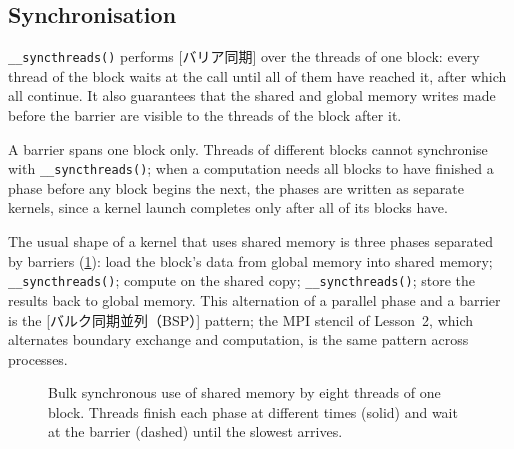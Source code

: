 \documentclass[../main.tex]{subfiles}
\begin{document}
\subsection{Synchronisation}

\begin{definition}
  \texttt{\_\_syncthreads()} performs [バリア同期]
  over the threads of one block: every thread of the block waits at the
  call until all of them have reached it, after which all continue.  It
  also guarantees that the shared and global memory writes made before the
  barrier are visible to the threads of the block after
  it.
\end{definition}

A barrier spans one block only.  Threads of different blocks cannot
synchronise with \texttt{\_\_syncthreads()}; when a computation needs all
blocks to have finished a phase before any block begins the next, the
phases are written as separate kernels, since a kernel launch completes
only after all of its blocks have.

\begin{definition}
  The usual shape of a kernel that uses shared memory is three phases
  separated by barriers (\cref{fig:l03-bsp}): load the block's data from
  global memory into shared memory; \texttt{\_\_syncthreads()}; compute on
  the shared copy; \texttt{\_\_syncthreads()}; store the results back to
  global memory.  This alternation of a parallel phase and a barrier is
  the [バルク同期並列（BSP）]
  pattern; the MPI stencil of Lesson~2, which alternates boundary
  exchange and computation, is the same pattern across processes.
\end{definition}

\begin{figure}[tb]
  \centering
  
  \caption{Bulk synchronous use of shared memory by eight threads of one
    block.  Threads finish each phase at different times (solid) and wait
    at the barrier (dashed) until the slowest arrives.}
  \label{fig:l03-bsp}
\end{figure}
\end{document}
